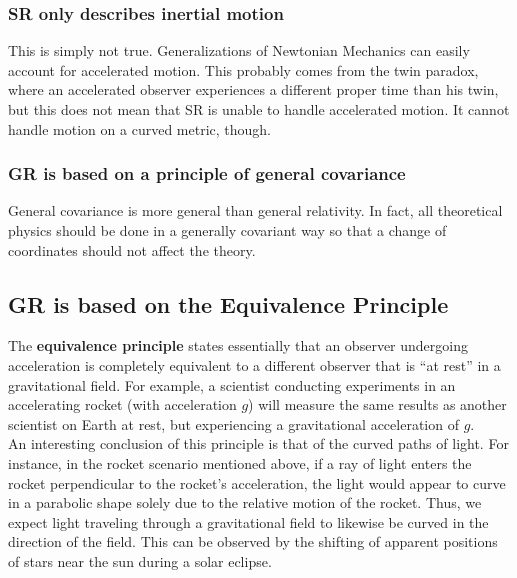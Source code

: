 \documentclass[10pt]{article}
\newcommand{\n}{\noindent}
\begin{document}
		\subsubsection{SR only describes inertial motion} %
		\label{ssub:sr_only_describes_inertial_motion}
		This is simply not true. Generalizations of Newtonian Mechanics can easily account for accelerated motion. This probably comes from the twin paradox, where an accelerated observer experiences a different proper time than his twin, but this does not mean that SR is unable to handle accelerated motion. It cannot handle motion on a curved metric, though.
		\subsubsection{GR is based on a principle of general covariance} %
		\label{ssub:gr_is_based_on_a_principle_of_general_covariance}
		General covariance is more general than general relativity. In fact, all theoretical physics should be done in a generally covariant way so that a change of coordinates should not affect the theory.
	\subsection{GR is based on the Equivalence Principle} %
	\label{sub:gr_is_based_on_the_equivalence_principle}
	The \textbf{equivalence principle} states essentially that an observer undergoing acceleration is completely equivalent to a different observer that is ``at rest'' in a gravitational field. For example, a scientist conducting experiments in an accelerating rocket (with acceleration $g$) will measure the same results as another scientist on Earth at rest, but experiencing a gravitational acceleration of $g$.\\
	
	\n An interesting conclusion of this principle is that of the curved paths of light. For instance, in the rocket scenario mentioned above, if a ray of light enters the rocket perpendicular to the rocket's acceleration, the light would appear to curve in a parabolic shape solely due to the relative motion of the rocket. Thus, we expect light traveling through a gravitational field to likewise be curved in the direction of the field. This can be observed by the shifting of apparent positions of stars near the sun during a solar eclipse.\\
	
\end{document}
